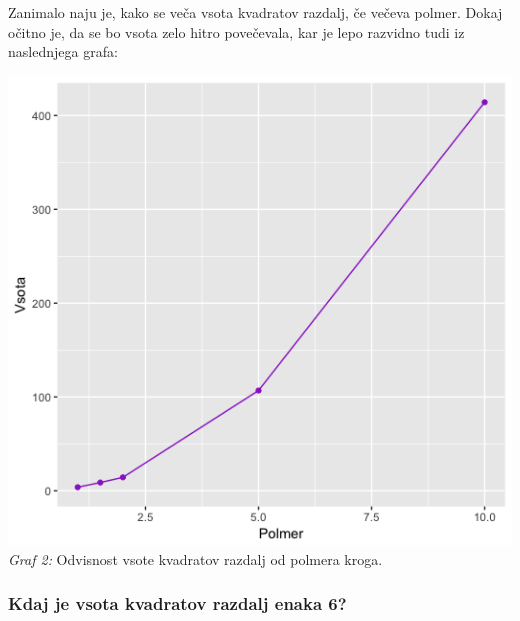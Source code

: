 \documentclass[a4paper]{report}
\begin{document}
Zanimalo naju je, kako se veča vsota kvadratov razdalj, če večeva polmer. Dokaj očitno je, da se bo vsota zelo hitro povečevala, kar je lepo razvidno tudi iz naslednjega grafa:
\begin{center}
\includegraphics[scale = 0.3]{krog_polmer}\\ 
\scriptsize{\textit{Graf 2: } Odvisnost vsote kvadratov razdalj od polmera kroga.}
\end{center}

\subsubsection{Kdaj je vsota kvadratov razdalj enaka 6?}
\end{document}
